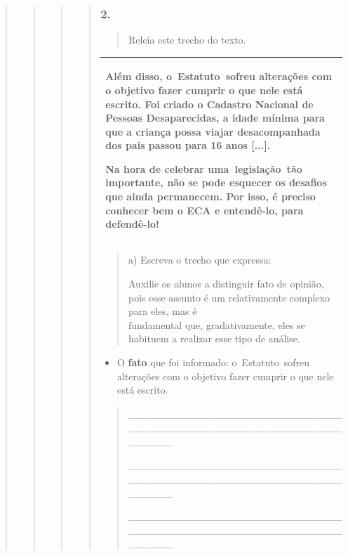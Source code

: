 \begin{quote}
\begin{quote}
\begin{quote}
\begin{quote}
\subsubsection{2. }\label{section-61}

\begin{quote}
Releia este trecho do texto.
\end{quote}

\begin{longtable}[]{@{}l@{}}
\toprule
\begin{minipage}[t]{0.97\columnwidth}\raggedright\strut
Além disso, o~Estatuto~sofreu alterações com o objetivo fazer cumprir o
que nele está escrito. Foi criado o Cadastro Nacional de Pessoas
Desaparecidas, a idade mínima para que a criança possa viajar
desacompanhada dos pais passou para 16 anos {[}...{]}.

Na hora de celebrar uma~legislação~tão importante, não se pode esquecer
os desafios que ainda permanecem. Por isso, é preciso conhecer bem o ECA
e entendê-lo, para defendê-lo!\strut
\end{minipage}\tabularnewline
\bottomrule
\end{longtable}

\begin{quote}
a) Escreva o trecho que expressa:

Auxilie os alunos a distinguir fato de opinião, pois esse assunto é um
relativamente complexo para eles, mas é\\
fundamental que, gradativamente, eles se\\
habituem a realizar esse tipo de análise.
\end{quote}

\begin{itemize}
\item
  O \textbf{fato} que foi informado: o~Estatuto~sofreu alterações com o
  objetivo fazer cumprir o que nele está escrito.
\end{itemize}

\begin{quote}
\_\_\_\_\_\_\_\_\_\_\_\_\_\_\_\_\_\_\_\_\_\_\_\_\_\_\_\_\_\_\_\_\_\_\_\_\_\_\_\_\_\_\_\_\_\_\_\_\_\_\_\_\_\_\_\_\_\_\_\_\_\_\_\_

\_\_\_\_\_\_\_\_\_\_\_\_\_\_\_\_\_\_\_\_\_\_\_\_\_\_\_\_\_\_\_\_\_\_\_\_\_\_\_\_\_\_\_\_\_\_\_\_\_\_\_\_\_\_\_\_\_\_\_\_\_\_\_\_

\_\_\_\_\_\_\_\_\_\_\_\_\_\_\_\_\_\_\_\_\_\_\_\_\_\_\_\_\_\_\_\_\_\_\_\_\_\_\_\_\_\_\_\_\_\_\_\_\_\_\_\_\_\_\_\_\_\_\_\_\_\_\_\_
\end{quote}


\end{quote}
\end{quote}
\end{quote}
\end{quote}
